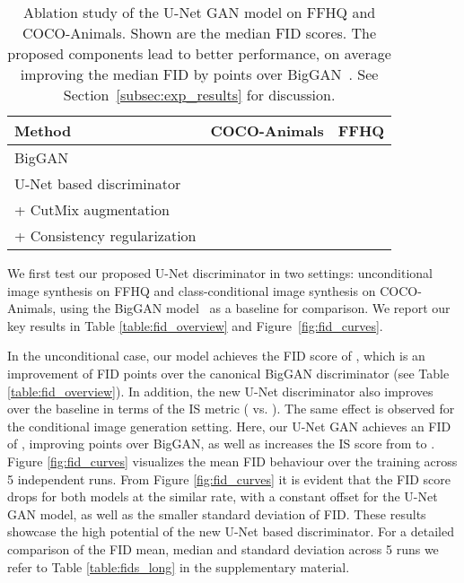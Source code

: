 \documentclass[10pt,twocolumn,letterpaper]{article}
\begin{document}
\begin{table}
	\vspace{-1em}
	\setlength{\tabcolsep}{0.0em}
	\renewcommand{\arraystretch}{1.1}
	\centering



	\begin{tabular}{lc@{ \hskip 0.05in}c}
		\normalsize{} Method & \normalsize{} COCO-Animals  & \normalsize{} FFHQ  \tabularnewline
		\hline 	\hline
		\normalsize{} BigGAN \cite{Brock2019} & \normalsize{}   & \normalsize{}  \tabularnewline
		\hline
		\normalsize{} U-Net based discriminator        & \normalsize{}   & \normalsize{} 	\tabularnewline
		\normalsize{} \quad + CutMix augmentation      & \normalsize{}   & \normalsize{}  \tabularnewline
		\normalsize{} \quad\quad+ Consistency regularization & \normalsize{}   & \normalsize{}   \tabularnewline
	\end{tabular}


\vspace{-0.5em}
    \caption{Ablation study of the U-Net GAN model on FFHQ and COCO-Animals. Shown are the median FID scores.
   The proposed components lead to better performance, on average improving the median FID by  points over BigGAN~\cite{Brock2019}. See Section~\ref{subsec:exp_results} for discussion. 
}
   \label{table:fid_ablation} \vspace{-1em}
\end{table}
 
We first test our proposed U-Net discriminator in two settings: unconditional image synthesis on FFHQ and 
class-conditional image synthesis on COCO-Animals, using the BigGAN model~\cite{Brock2019} as a baseline for comparison. We report our key results in Table \ref{table:fid_overview} and Figure~\ref{fig:fid_curves}. 

In the unconditional case, our model achieves the FID score of , which is an improvement of  FID points over the canonical BigGAN discriminator (see Table \ref{table:fid_overview}). In addition, the new U-Net discriminator also improves over the baseline in terms of the IS metric ( vs. ).  
The same effect is observed for the conditional image generation setting. Here, our U-Net GAN achieves an FID of , improving  points over BigGAN, as well as increases the IS score from  to . 
Figure \ref{fig:fid_curves} visualizes the mean FID behaviour over the training across 5 independent runs.
From Figure \ref{fig:fid_curves} it is evident that the FID score drops for both models at the similar rate, with a constant offset for the U-Net GAN model, as well as the smaller standard deviation of FID. These results showcase the high potential of the new U-Net based discriminator.
For a detailed comparison of the FID mean, median and standard deviation across 5 runs we refer to Table \ref{table:fids_long} in the supplementary material. 
\end{document}
